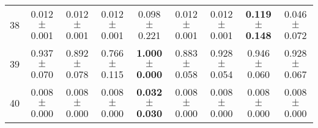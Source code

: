 \begin{table}[!ht]
{\begin{tabular}{r c c c c c c c c}
38 & 0.012 $\pm$ 0.001 & 0.012 $\pm$ 0.001 & 0.012 $\pm$ 0.001 & 0.098 $\pm$ 0.221 & 0.012 $\pm$ 0.001 & 0.012 $\pm$ 0.001 & \textbf{0.119 $\pm$ 0.148} & 0.046 $\pm$ 0.072 \\
39 & 0.937 $\pm$ 0.070 & 0.892 $\pm$ 0.078 & 0.766 $\pm$ 0.115 & \textbf{1.000 $\pm$ 0.000} & 0.883 $\pm$ 0.058 & 0.928 $\pm$ 0.054 & 0.946 $\pm$ 0.060 & 0.928 $\pm$ 0.067 \\
40 & 0.008 $\pm$ 0.000 & 0.008 $\pm$ 0.000 & 0.008 $\pm$ 0.000 & \textbf{0.032 $\pm$ 0.030} & 0.008 $\pm$ 0.000 & 0.008 $\pm$ 0.000 & 0.008 $\pm$ 0.000 & 0.008 $\pm$ 0.000 \\
\end{tabular}}
\end{table}
